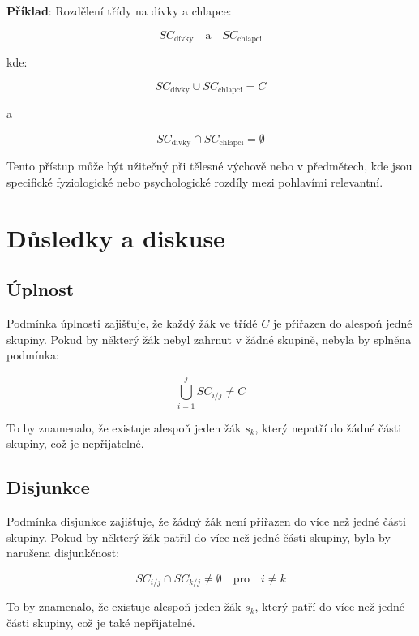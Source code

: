 \begin{samepage}
\setlength{\parindent}{0em}
\setlength{\parskip}{1em}

\textbf{Příklad}: Rozdělení třídy na dívky a chlapce:
\nopagebreak

\[
SC_{\text{dívky}} \quad \text{a} \quad SC_{\text{chlapci}}
\]
\nopagebreak

kde:
\nopagebreak

\[
SC_{\text{dívky}} \cup SC_{\text{chlapci}} = C
\]
\nopagebreak

a
\nopagebreak

\[
SC_{\text{dívky}} \cap SC_{\text{chlapci}} = \emptyset
\]

Tento přístup může být užitečný při tělesné výchově nebo v předmětech, kde jsou specifické fyziologické nebo psychologické rozdíly mezi pohlavími relevantní.
\end{samepage}

\section{Důsledky a diskuse}

\subsection*{Úplnost}

Podmínka úplnosti zajišťuje, že každý žák ve třídě \( C \) je přiřazen do alespoň jedné skupiny. Pokud by některý žák nebyl zahrnut v žádné skupině, nebyla by splněna podmínka:

\[
\bigcup_{i=1}^{j} SC_{i/j} \neq C
\]

To by znamenalo, že existuje alespoň jeden žák \( s_k \), který nepatří do žádné části skupiny, což je nepřijatelné.
\pagebreak
\begin{samepage}
\subsection*{Disjunkce}

Podmínka disjunkce zajišťuje, že žádný žák není přiřazen do více než jedné části skupiny. Pokud by některý žák patřil do více než jedné části skupiny, byla by narušena disjunkčnost:
\nopagebreak

\[
SC_{i/j} \cap SC_{k/j} \neq \emptyset \quad \text{pro} \quad i \neq k
\]
\nopagebreak

To by znamenalo, že existuje alespoň jeden žák \( s_k \), který patří do více než jedné části skupiny, což je také nepřijatelné.
\end{samepage}

